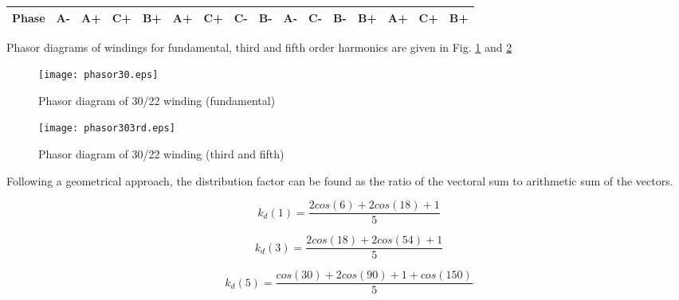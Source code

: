 \documentclass{reportClass}
\begin{document}
\begin{table}[h!]
\begin{tabular}{|clllllllllllllll|}
\multicolumn{1}{|c|}{\textbf{Phase}}   & \multicolumn{1}{l|}{\cellcolor[HTML]{FCFF2F}\textbf{A-}} & \multicolumn{1}{l|}{\cellcolor[HTML]{FCFF2F}\textbf{A+}} & \multicolumn{1}{l|}{\cellcolor[HTML]{CBCEFB}\textbf{C+}} & \multicolumn{1}{l|}{\cellcolor[HTML]{90E3FB}\textbf{B+}} & \multicolumn{1}{l|}{\cellcolor[HTML]{FCFF2F}\textbf{A+}} & \multicolumn{1}{l|}{\cellcolor[HTML]{CBCEFB}\textbf{C+}} & \multicolumn{1}{l|}{\cellcolor[HTML]{CBCEFB}\textbf{C-}} & \multicolumn{1}{l|}{\cellcolor[HTML]{90E3FB}\textbf{B-}} & \multicolumn{1}{l|}{\cellcolor[HTML]{FCFF2F}\textbf{A-}} & \multicolumn{1}{l|}{\cellcolor[HTML]{CBCEFB}\textbf{C-}} & \multicolumn{1}{l|}{\cellcolor[HTML]{90E3FB}\textbf{B-}} & \multicolumn{1}{l|}{\cellcolor[HTML]{90E3FB}\textbf{B+}} & \multicolumn{1}{l|}{\cellcolor[HTML]{FCFF2F}\textbf{A+}} & \multicolumn{1}{l|}{\cellcolor[HTML]{CBCEFB}\textbf{C+}} & \cellcolor[HTML]{90E3FB}\textbf{B+} \\ \hline
\end{tabular}
\end{table}

Phasor diagrams of windings for fundamental, third and fifth order harmonics are given in Fig. \ref{fig:phas30} and \ref{fig:phas303} 

\begin{figure}[h!]
    \centering
    \texttt{[image: phasor30.eps]}
    \caption{Phasor diagram of 30/22 winding (fundamental)}
    \label{fig:phas30}
\end{figure}

\begin{figure}[h!]
    \centering
    \texttt{[image: phasor303rd.eps]}

    \caption{Phasor diagram of 30/22 winding (third and fifth)}
    \label{fig:phas303}
\end{figure}

Following a geometrical approach, the distribution factor can be found as the ratio of the vectoral sum to arithmetic sum of the vectors.

\begin{equation*}
    k_d(1) = \dfrac{2cos(6)+2cos(18)+1}{5}
\end{equation*}

\begin{equation*}
    k_d(3) = \dfrac{2cos(18)+2cos(54)+1}{5}
\end{equation*}

\begin{equation*}
    k_d(5) = \dfrac{cos(30)+2cos(90)+1+cos(150)}{5}
\end{equation*}
\end{document}
